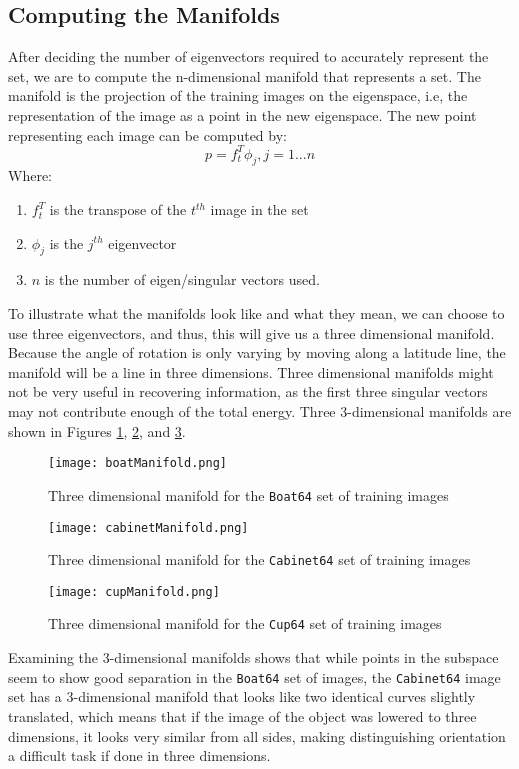 \documentclass[10pt,twocolumn,letterpaper]{article}
\begin{document}
\subsection{Computing the Manifolds}
After deciding the number of eigenvectors required to accurately represent the set, we are to compute the n-dimensional manifold that represents a set. The manifold is the projection of the training images on the eigenspace, i.e, the representation of the image as a point in the new eigenspace. The new point representing each image can be computed by:
\begin{equation}
p = f_{t}^{T}\phi_{j}, j=1...n
\end{equation}
Where:
\begin{enumerate}
\item $f_t^{T}$ is the transpose of the $t^{th}$ image in the set
\item $\phi_{j}$ is the $j^{th}$ eigenvector
\item $n$ is the number of eigen/singular vectors used.
\end{enumerate}
To illustrate what the manifolds look like and what they mean, we can choose to use three eigenvectors, and thus, this will give us a three dimensional manifold. Because the angle of rotation is only varying by moving along a latitude line, the manifold will be a line in three dimensions. Three dimensional manifolds might not be very useful in recovering information, as the first three singular vectors may not contribute enough of the total energy. Three 3-dimensional manifolds are shown in Figures \ref{fig:manifoldBoat}, \ref{fig:manifoldCabinet}, and \ref{fig:manifoldCup}.
\begin{figure}
\texttt{[image: boatManifold.png]}
\caption{Three dimensional manifold for the \texttt{Boat64} set of training images}
\label{fig:manifoldBoat}
\end{figure}

\begin{figure}
\texttt{[image: cabinetManifold.png]}
\caption{Three dimensional manifold for the \texttt{Cabinet64} set of training images}
\label{fig:manifoldCabinet}
\end{figure}


\begin{figure}
\texttt{[image: cupManifold.png]}
\caption{Three dimensional manifold for the \texttt{Cup64} set of training images}
\label{fig:manifoldCup}
\end{figure}
Examining the 3-dimensional manifolds shows that while points in the subspace seem to show good separation in the \texttt{Boat64} set of images, the \texttt{Cabinet64} image set has a 3-dimensional manifold that looks like two identical curves slightly translated, which means that if the image of the object was lowered to three dimensions, it looks very similar from all sides, making distinguishing orientation a difficult task if done in three dimensions.
\end{document}
